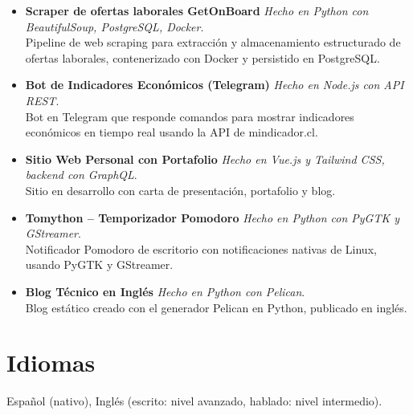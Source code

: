 \documentclass[11pt,a4paper]{article}
\begin{document}
\begin{itemize}[leftmargin=*, noitemsep, topsep=2pt]
    \item \textbf{Scraper de ofertas laborales GetOnBoard} \textit{Hecho en Python con BeautifulSoup, PostgreSQL, Docker}.\\
    Pipeline de web scraping para extracción y almacenamiento estructurado de ofertas laborales, contenerizado con Docker y persistido en PostgreSQL.
    
    \item \textbf{Bot de Indicadores Económicos (Telegram)} \textit{Hecho en Node.js con API REST}.\\
    Bot en Telegram que responde comandos para mostrar indicadores económicos en tiempo real usando la API de mindicador.cl.
    \item \textbf{Sitio Web Personal con Portafolio} \textit{Hecho en Vue.js y Tailwind CSS, backend con GraphQL}.\\
    Sitio en desarrollo con carta de presentación, portafolio y blog.

    \item \textbf{Tomython -- Temporizador Pomodoro} \textit{Hecho en Python con PyGTK y GStreamer}.\\
    Notificador Pomodoro de escritorio con notificaciones nativas de Linux, usando PyGTK y GStreamer.
    
    \item \textbf{Blog Técnico en Inglés} \textit{Hecho en Python con Pelican}.\\
    Blog estático creado con el generador Pelican en Python, publicado en inglés.

\end{itemize}

\section*{Idiomas}
Español (nativo), Inglés (escrito: nivel avanzado, hablado: nivel intermedio).
\end{document}
